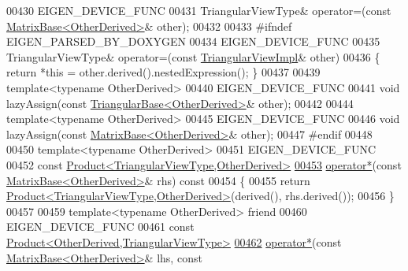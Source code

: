 \begin{DoxyCode}
00430     EIGEN\_DEVICE\_FUNC
00431     TriangularViewType& operator=(\textcolor{keyword}{const} \hyperlink{group___core___module_class_eigen_1_1_matrix_base}{MatrixBase<OtherDerived>}& other);
00432 
00433 \textcolor{preprocessor}{#ifndef EIGEN\_PARSED\_BY\_DOXYGEN}
00434     EIGEN\_DEVICE\_FUNC
00435     TriangularViewType& operator=(\textcolor{keyword}{const} \hyperlink{class_eigen_1_1_triangular_view_impl}{TriangularViewImpl}& other)
00436     \{ \textcolor{keywordflow}{return} *\textcolor{keyword}{this} = other.derived().nestedExpression(); \}
00437 
00439     \textcolor{keyword}{template}<\textcolor{keyword}{typename} OtherDerived>
00440     EIGEN\_DEVICE\_FUNC
00441     \textcolor{keywordtype}{void} lazyAssign(\textcolor{keyword}{const} \hyperlink{group___core___module_class_eigen_1_1_triangular_base}{TriangularBase<OtherDerived>}& other);
00442 
00444     \textcolor{keyword}{template}<\textcolor{keyword}{typename} OtherDerived>
00445     EIGEN\_DEVICE\_FUNC
00446     \textcolor{keywordtype}{void} lazyAssign(\textcolor{keyword}{const} \hyperlink{group___core___module_class_eigen_1_1_matrix_base}{MatrixBase<OtherDerived>}& other);
00447 \textcolor{preprocessor}{#endif}
00448 
00450     \textcolor{keyword}{template}<\textcolor{keyword}{typename} OtherDerived>
00451     EIGEN\_DEVICE\_FUNC
00452     \textcolor{keyword}{const} \hyperlink{group___core___module_class_eigen_1_1_product}{Product<TriangularViewType,OtherDerived>}
\hyperlink{group___core___module_a1e5b71b779607d4109ade17187a31b82}{00453}     \hyperlink{group___core___module_a1e5b71b779607d4109ade17187a31b82}{operator*}(\textcolor{keyword}{const} \hyperlink{group___core___module_class_eigen_1_1_matrix_base}{MatrixBase<OtherDerived>}& rhs)\textcolor{keyword}{ const}
00454 \textcolor{keyword}{    }\{
00455       \textcolor{keywordflow}{return} \hyperlink{group___core___module_class_eigen_1_1_product}{Product<TriangularViewType,OtherDerived>}(derived(), 
      rhs.derived());
00456     \}
00457 
00459     \textcolor{keyword}{template}<\textcolor{keyword}{typename} OtherDerived> \textcolor{keyword}{friend}
00460     EIGEN\_DEVICE\_FUNC
00461     \textcolor{keyword}{const} \hyperlink{group___core___module_class_eigen_1_1_product}{Product<OtherDerived,TriangularViewType>}
\hyperlink{group___core___module_a74022a74c156ec81e2e06d8f077e0eff}{00462}     \hyperlink{group___core___module_a74022a74c156ec81e2e06d8f077e0eff}{operator*}(\textcolor{keyword}{const} \hyperlink{group___core___module_class_eigen_1_1_matrix_base}{MatrixBase<OtherDerived>}& lhs, \textcolor{keyword}{const} 

\end{DoxyCode}
